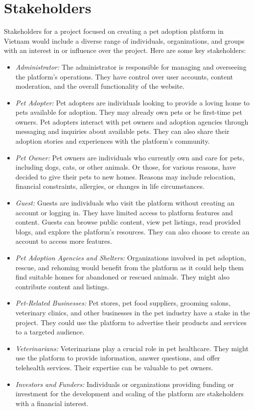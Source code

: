 \section{Stakeholders}
Stakeholders for a project focused on creating a pet adoption platform in Vietnam would include a diverse range of individuals, organizations, and groups with an interest in or influence over the project. Here are some key stakeholders:
\begin{itemize}
  \item \textit{Administrator:} The administrator is responsible for managing and overseeing the platform's operations. They have control over user accounts, content moderation, and the overall functionality of the website.
  \item \textit{Pet Adopter:} Pet adopters are individuals looking to provide a loving home to pets available for adoption. They may already own pets or be first-time pet owners. Pet adopters interact with pet owners and adoption agencies through messaging and inquiries about available pets. They can also share their adoption stories and experiences with the platform's community.
  \item \textit{Pet Owner:} Pet owners are individuals who currently own and care for pets, including dogs, cats, or other animals. Or those, for various reasons, have decided to give their pets to new homes. Reasons may include relocation, financial constraints, allergies, or changes in life circumstances.
  \item \textit{Guest:} Guests are individuals who visit the platform without creating an account or logging in. They have limited access to platform features and content. Guests can browse public content, view pet listings, read provided blogs, and explore the platform's resources. They can also choose to create an account to access more features.
  \item \textit{Pet Adoption Agencies and Shelters:} Organizations involved in pet adoption, rescue, and rehoming would benefit from the platform as it could help them find suitable homes for abandoned or rescued animals. They might also contribute content and listings.
  \item \textit{Pet-Related Businesses:} Pet stores, pet food suppliers, grooming salons, veterinary clinics, and other businesses in the pet industry have a stake in the project. They could use the platform to advertise their products and services to a targeted audience.
  \item \textit{Veterinarians:} Veterinarians play a crucial role in pet healthcare. They might use the platform to provide information, answer questions, and offer telehealth services. Their expertise can be valuable to pet owners.
  \item \textit{Investors and Funders:} Individuals or organizations providing funding or investment for the development and scaling of the platform are stakeholders with a financial interest.
\end{itemize}

